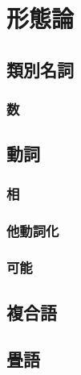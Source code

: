 \section{形態論}
\subsection{類別名詞}
\subsubsection{数}
\subsection{動詞}
\subsubsection{相}
\subsubsection{他動詞化}
\subsubsection{可能}
\subsection{複合語}
\subsection{畳語}